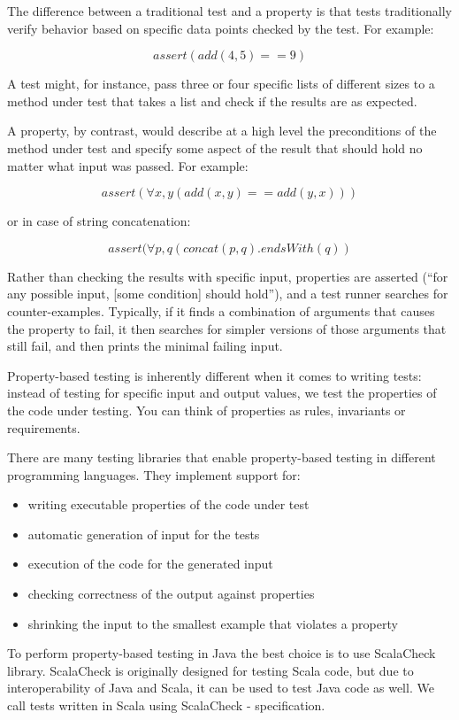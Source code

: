 \documentclass{article}
\begin{document}
The difference between a traditional test and a property is that tests
traditionally verify behavior based on specific data points checked by
the test. For example:

\[assert(add(4,5) == 9)\]

A test might, for instance, pass three or four specific lists of different
sizes to a method under test that takes a list and check
if the results are as expected. 

A property, by contrast, would describe at a high level the
preconditions of the method under test and specify some aspect of the
result that should hold no matter what input was passed. For
example:

\[assert(\forall x, y (add(x,y) == add(y,x))) \]

or in case of string concatenation:

\[assert(\forall p, q (concat(p,q).endsWith(q))\]

Rather than checking the results with specific input, properties are
asserted (“for any possible input, [some condition] should hold”), and
a test runner searches for counter-examples. Typically, if it finds a
combination of arguments that causes the property to fail, it then
searches for simpler versions of those arguments that still fail, and
then prints the minimal failing input.

Property-based testing is inherently different when it comes to
writing tests: instead of testing for specific input and output values, we
test the properties of the code under testing. You can think of
properties as rules, invariants or requirements.

There are many testing libraries that enable property-based testing
in different programming languages. They implement support for:

\begin{itemize}
\item writing executable properties of the code under test
\item automatic generation of input for the tests
\item execution of the code for the generated input
\item checking correctness of the output against properties
\item shrinking the input to the smallest example that violates a property
\end{itemize}

To perform property-based testing in Java the best choice is to use
ScalaCheck library. ScalaCheck is originally designed for testing
Scala code, but due to interoperability of Java and Scala, it can be
used to test Java code as well. We call tests written in Scala using
ScalaCheck - specification. 
\end{document}
